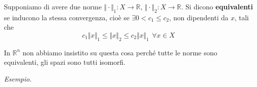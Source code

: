 \begin{definition}
    Supponiamo di avere due norme $\Vert \cdotp \Vert _{1} :X\rightarrow \mathbb{R}$, $\Vert \cdotp \Vert _{2} :X\rightarrow \mathbb{R}$. Si dicono \textbf{equivalenti} se inducono la stessa convergenza, cioè se $\exists 0< c_{1} \leq c_{2}$, non dipendenti da $x$, tali che
    \begin{equation*}
        c_{1}\Vert x\Vert _{1} \leq \Vert x\Vert _{2} \leq c_{2}\Vert x\Vert _{1} \ \ \forall x\in X
    \end{equation*}
\end{definition}
\begin{nb}
    In $\mathbb{R}^{n}$ non abbiamo insistito su questa cosa perché tutte le norme sono equivalenti, gli spazi sono tutti isomorfi.
\end{nb}
\textit{Esempio.}

